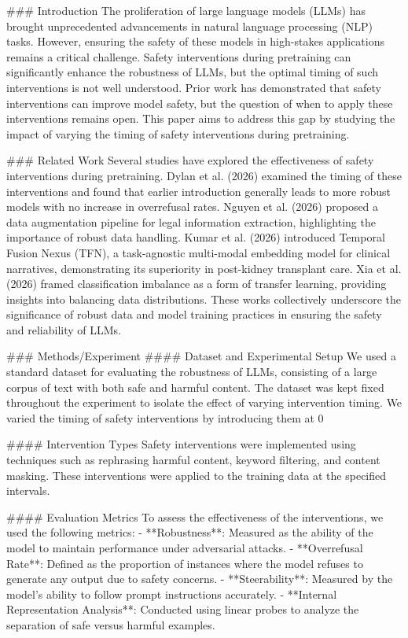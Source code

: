 ### Introduction
The proliferation of large language models (LLMs) has brought unprecedented advancements in natural language processing (NLP) tasks. However, ensuring the safety of these models in high-stakes applications remains a critical challenge. Safety interventions during pretraining can significantly enhance the robustness of LLMs, but the optimal timing of such interventions is not well understood. Prior work has demonstrated that safety interventions can improve model safety, but the question of when to apply these interventions remains open. This paper aims to address this gap by studying the impact of varying the timing of safety interventions during pretraining.

### Related Work
Several studies have explored the effectiveness of safety interventions during pretraining. Dylan et al. (2026) examined the timing of these interventions and found that earlier introduction generally leads to more robust models with no increase in overrefusal rates. Nguyen et al. (2026) proposed a data augmentation pipeline for legal information extraction, highlighting the importance of robust data handling. Kumar et al. (2026) introduced Temporal Fusion Nexus (TFN), a task-agnostic multi-modal embedding model for clinical narratives, demonstrating its superiority in post-kidney transplant care. Xia et al. (2026) framed classification imbalance as a form of transfer learning, providing insights into balancing data distributions. These works collectively underscore the significance of robust data and model training practices in ensuring the safety and reliability of LLMs.

### Methods/Experiment
#### Dataset and Experimental Setup
We used a standard dataset for evaluating the robustness of LLMs, consisting of a large corpus of text with both safe and harmful content. The dataset was kept fixed throughout the experiment to isolate the effect of varying intervention timing. We varied the timing of safety interventions by introducing them at 0%

#### Intervention Types
Safety interventions were implemented using techniques such as rephrasing harmful content, keyword filtering, and content masking. These interventions were applied to the training data at the specified intervals.

#### Evaluation Metrics
To assess the effectiveness of the interventions, we used the following metrics:
- **Robustness**: Measured as the ability of the model to maintain performance under adversarial attacks.
- **Overrefusal Rate**: Defined as the proportion of instances where the model refuses to generate any output due to safety concerns.
- **Steerability**: Measured by the model's ability to follow prompt instructions accurately.
- **Internal Representation Analysis**: Conducted using linear probes to analyze the separation of safe versus harmful examples.

